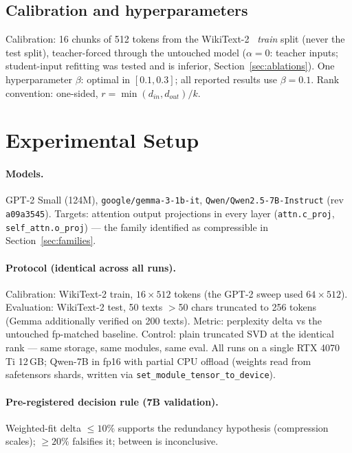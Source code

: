 \documentclass[11pt]{article}
\begin{document}
\subsection{Calibration and hyperparameters}
Calibration: 16 chunks of 512 tokens from the WikiText-2~\cite{merity2016} \emph{train}
split (never the test split), teacher-forced through the untouched model
($\alpha = 0$: teacher inputs; student-input refitting was tested and is
inferior, Section~\ref{sec:ablations}). One hyperparameter $\beta$:
optimal in $[0.1, 0.3]$; all reported results use $\beta = 0.1$. Rank
convention: one-sided, $r = \min(d_{in}, d_{out})/k$.

\section{Experimental Setup}

\paragraph{Models.} GPT-2 Small (124M), \texttt{google/gemma-3-1b-it},
\texttt{Qwen/Qwen2.5-7B-Instruct} (rev \texttt{a09a3545}). Targets:
attention output projections in every layer (\texttt{attn.c\_proj},
\texttt{self\_attn.o\_proj}) --- the family identified as compressible in
Section~\ref{sec:families}.

\paragraph{Protocol (identical across all runs).} Calibration: WikiText-2
train, $16\times512$ tokens (the GPT-2 sweep used $64\times512$).
Evaluation: WikiText-2 test, 50 texts $>$50 chars truncated to 256 tokens
(Gemma additionally verified on 200 texts). Metric: perplexity delta vs the
untouched fp-matched baseline. Control: plain truncated SVD at the
identical rank --- same storage, same modules, same eval. All runs on a
single RTX 4070 Ti 12\,GB; Qwen-7B in fp16 with partial CPU offload
(weights read from safetensors shards, written via
\texttt{set\_module\_tensor\_to\_device}).

\paragraph{Pre-registered decision rule (7B validation).} Weighted-fit
delta $\le 10\%$ supports the redundancy hypothesis (compression scales);
$\ge 20\%$ falsifies it; between is inconclusive.
\end{document}
